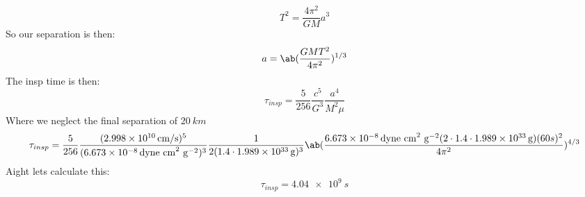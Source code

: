 \begin{equation}
    T^2 = \frac{4\pi^2}{GM}a^3
\end{equation}
So our separation is then:
\begin{equation}
    a = \ab(\frac{GMT^2}{4\pi^2})^{1/3}
\end{equation}
The insp time is then:
\begin{equation}
    \tau_{insp} = \frac{5}{256}\frac{c^5}{G^3}\frac{a^4}{M^2\mu}
\end{equation}
Where we neglect the final separation of $\qty{20}{km}$
\begin{equation}
    \tau_{insp} = \frac{5}{256}\frac{(\qty{2.998e10}{cm/s})^5}{(\qty{6.673e-8}{dyne\ cm^2\ g^{-2}})^3}\frac{1}{2(1.4\cdot\qty{1.989e33}{g})^3}\ab(\frac{\qty{6.673e-8}{dyne\ cm^2\ g^{-2}}(2\cdot1.4\cdot\qty{1.989e33}{g})(60s)^2}{4\pi^2})^{4/3}
\end{equation}
Aight lets calculate this:
\begin{equation}
    \tau_{insp} = \qty{4.04e9}{s}
\end{equation}